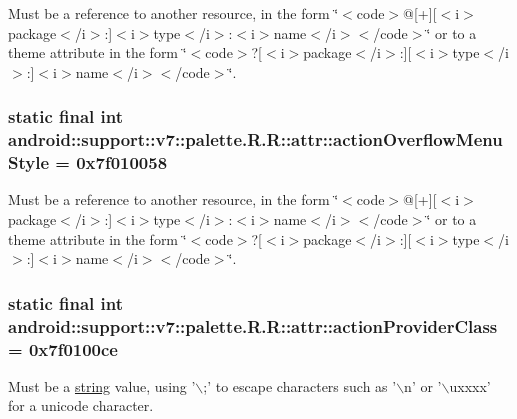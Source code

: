 Must be a reference to another resource, in the form \char`\"{}$<$code$>$@\mbox{[}+\mbox{]}\mbox{[}$<$i$>$package$<$/i$>$:\mbox{]}$<$i$>$type$<$/i$>$:$<$i$>$name$<$/i$>$$<$/code$>$\char`\"{} or to a theme attribute in the form \char`\"{}$<$code$>$?\mbox{[}$<$i$>$package$<$/i$>$:\mbox{]}\mbox{[}$<$i$>$type$<$/i$>$:\mbox{]}$<$i$>$name$<$/i$>$$<$/code$>$\char`\"{}. \hypertarget{classandroid_1_1support_1_1v7_1_1palette_1_1_r_1_1attr_a41c127e590d0df86a074d5f754c3cfd}{
\subsubsection[{actionOverflowMenuStyle}]{\setlength{\rightskip}{0pt plus 5cm}static final int android::support::v7::palette.R.R::attr::actionOverflowMenuStyle = 0x7f010058}}
\label{classandroid_1_1support_1_1v7_1_1palette_1_1_r_1_1attr_a41c127e590d0df86a074d5f754c3cfd}


Must be a reference to another resource, in the form \char`\"{}$<$code$>$@\mbox{[}+\mbox{]}\mbox{[}$<$i$>$package$<$/i$>$:\mbox{]}$<$i$>$type$<$/i$>$:$<$i$>$name$<$/i$>$$<$/code$>$\char`\"{} or to a theme attribute in the form \char`\"{}$<$code$>$?\mbox{[}$<$i$>$package$<$/i$>$:\mbox{]}\mbox{[}$<$i$>$type$<$/i$>$:\mbox{]}$<$i$>$name$<$/i$>$$<$/code$>$\char`\"{}. \hypertarget{classandroid_1_1support_1_1v7_1_1palette_1_1_r_1_1attr_c0017cebe6b7565aa3e6af2f59b92179}{
\subsubsection[{actionProviderClass}]{\setlength{\rightskip}{0pt plus 5cm}static final int android::support::v7::palette.R.R::attr::actionProviderClass = 0x7f0100ce}}
\label{classandroid_1_1support_1_1v7_1_1palette_1_1_r_1_1attr_c0017cebe6b7565aa3e6af2f59b92179}


Must be a \hyperlink{classandroid_1_1support_1_1v7_1_1palette_1_1_r_1_1string}{string} value, using '$\backslash$;' to escape characters such as '$\backslash$n' or '$\backslash$uxxxx' for a unicode character. 

